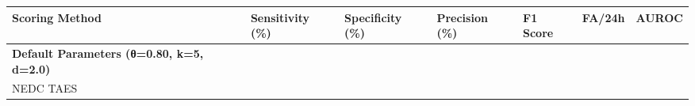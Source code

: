 \documentclass[
  10pt,
]{article}
\begin{document}
\begin{longtable}[]{@{}lllllll@{}}
\toprule
\begin{minipage}[b]{0.12\columnwidth}\raggedright
Scoring Method\strut
\end{minipage} & \begin{minipage}[b]{0.12\columnwidth}\raggedright
Sensitivity (\%)\strut
\end{minipage} & \begin{minipage}[b]{0.12\columnwidth}\raggedright
Specificity (\%)\strut
\end{minipage} & \begin{minipage}[b]{0.12\columnwidth}\raggedright
Precision (\%)\strut
\end{minipage} & \begin{minipage}[b]{0.12\columnwidth}\raggedright
F1 Score\strut
\end{minipage} & \begin{minipage}[b]{0.12\columnwidth}\raggedright
FA/24h\strut
\end{minipage} & \begin{minipage}[b]{0.12\columnwidth}\raggedright
AUROC\strut
\end{minipage}\tabularnewline
\midrule
\endhead
\begin{minipage}[t]{0.12\columnwidth}\raggedright
\textbf{Default Parameters (θ=0.80, k=5, d=2.0)}\strut
\end{minipage} & \begin{minipage}[t]{0.12\columnwidth}\raggedright
\strut
\end{minipage} & \begin{minipage}[t]{0.12\columnwidth}\raggedright
\strut
\end{minipage} & \begin{minipage}[t]{0.12\columnwidth}\raggedright
\strut
\end{minipage} & \begin{minipage}[t]{0.12\columnwidth}\raggedright
\strut
\end{minipage} & \begin{minipage}[t]{0.12\columnwidth}\raggedright
\strut
\end{minipage} & \begin{minipage}[t]{0.12\columnwidth}\raggedright
\strut
\end{minipage}\tabularnewline
\begin{minipage}[t]{0.12\columnwidth}\raggedright
NEDC TAES\strut
\end{minipage} & \begin{minipage}[t]{0.12\columnwidth}\raggedright

\end{minipage}
\end{longtable}
\end{document}

